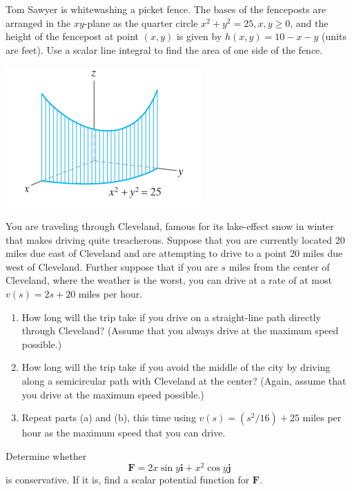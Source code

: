 \documentclass[11pt,letterpaper,boxed]{hmcpset}
\begin{document}
\begin{problem}[Colley 6.1 \#34]
Tom Sawyer is whitewashing a picket fence. The bases of the fenceposts are arranged 
in the $xy$-plane as the quarter circle $x^2+y^2 =25,x,y\geq0$, and the height of the fencepost at point $(x,y)$ is given by $h(x,y)=10-x-y$ (units are feet). Use a scalar line integral 
to find the area of one side of the fence.
\begin{center}
\includegraphics[scale=0.6]{sawyer.png}
\end{center}
\end{problem}

\begin{solution}
\vfill
\end{solution}
\newpage

\begin{problem}[Colley 6.1 \#40]
You are traveling through Cleveland, famous for its lake-effect snow in winter that makes driving quite treacherous. 
Suppose that you are currently located 20 miles due east of Cleveland and are attempting to drive to a 
point 20 miles due west of Cleveland. Further suppose that if you are $s$ miles from the center of Cleveland,
 where the weather is the worst, you can drive at a rate of at most $v(s) = 2s +20$ miles per hour.
 \begin{enumerate}
 \item How long will the trip take if you drive on a straight-line path directly through Cleveland? (Assume that you always drive at the maximum speed possible.)
 \item How long will the trip take if you avoid the middle of the city by driving along a semicircular path with Cleveland at the center? (Again, assume that you drive at the maximum speed possible.)
 \item Repeat parts (a) and (b), this time using $v(s) =
(s^2/16) + 25$ miles per hour as the maximum speed that you can drive.
 \end{enumerate}
\end{problem}

\begin{solution}
\vfill
\end{solution}
\newpage

\begin{problem}[Colley 6.2 \#4]
Determine whether
\[
	\mathbf{F} = 2x\sin{y}\mathbf{i} + x^2\cos{y}\mathbf{j}
\]
is conservative. If it is, find a scalar potential function for $\mathbf{F}$.
\end{problem}

\begin{solution}
\vfill
\end{solution}
\newpage
\end{document}
